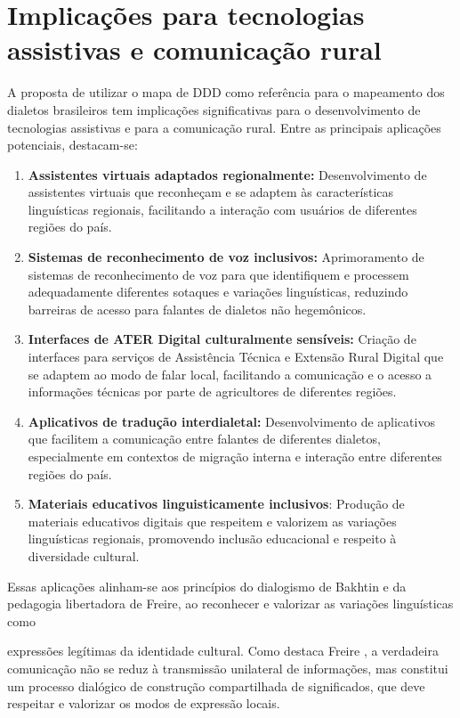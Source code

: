\section{Implicações para tecnologias assistivas e comunicação rural}
A proposta de utilizar o mapa de DDD como referência para o mapeamento dos dialetos brasileiros tem implicações significativas para o desenvolvimento de tecnologias assistivas e para a comunicação rural. Entre as principais aplicações potenciais, destacam-se:
\begin{enumerate}
    \item \textbf{Assistentes virtuais adaptados regionalmente:} Desenvolvimento de assistentes virtuais que reconheçam e se adaptem às características linguísticas regionais, facilitando a interação com usuários de diferentes regiões do país.
    \item \textbf{Sistemas de reconhecimento de voz inclusivos:} Aprimoramento de sistemas de reconhecimento de voz para que identifiquem e processem adequadamente diferentes sotaques e variações linguísticas, reduzindo barreiras de acesso para falantes de dialetos não hegemônicos.
    \item \textbf{Interfaces de ATER Digital culturalmente sensíveis: }Criação de interfaces para serviços de Assistência Técnica e Extensão Rural Digital que se adaptem ao modo de falar local, facilitando a comunicação e o acesso a informações técnicas por parte de agricultores de diferentes regiões.
    \item \textbf{Aplicativos de tradução interdialetal:} Desenvolvimento de aplicativos que facilitem a comunicação entre falantes de diferentes dialetos, especialmente em contextos de migração interna e interação entre diferentes regiões do país.
    \item \textbf{Materiais educativos linguisticamente inclusivos}: Produção de materiais educativos digitais que respeitem e valorizem as variações linguísticas regionais, promovendo inclusão educacional e respeito à diversidade cultural.
\end{enumerate}

Essas aplicações alinham-se aos princípios do dialogismo de Bakhtin e da pedagogia libertadora de Freire, ao reconhecer e valorizar as variações linguísticas como

expressões legítimas da identidade cultural. Como destaca Freire \cite{freire2005pedagogia}, a verdadeira comunicação não se reduz à transmissão unilateral de informações, mas constitui um processo dialógico de construção compartilhada de significados, que deve respeitar e valorizar os modos de expressão locais.

